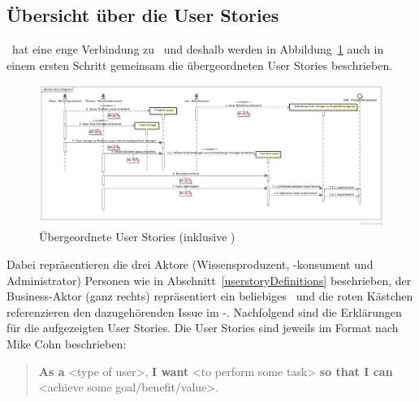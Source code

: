 		
	\begin{landscape}
	\subsection{Übersicht über die User Stories}
	
		\eeppi\ hat eine enge Verbindung zu \cdar\ und deshalb werden in Abbildung~\ref{fig:UserStoryDiagram} auch in einem ersten Schritt gemeinsam die übergeordneten User Stories beschrieben.
	
		\begin{figure}[H]
				\includegraphics[width=0.95\linewidth]{media/diagrams/UserStoryDiagram.png}
				\centering
				\caption{Übergeordnete User Stories (inklusive \cdar)}
				\label{fig:UserStoryDiagram}
		\end{figure}
		
		Dabei repräsentieren die drei Aktore (Wissensproduzent, -konsument und Administrator) Personen wie in Abschnitt~\ref{userstoryDefinitions} beschrieben,
		der Business-Aktor (ganz rechts) repräsentiert ein beliebiges \ppt\ und die roten Kästchen referenzieren den dazugehörenden Issue im \eeppi-\ppt.
		Nachfolgend sind die Erklärungen für die aufgezeigten User Stories.
		Die User Stories sind jeweils im Format nach Mike Cohn\cite{rasmusson_agile_2012} beschrieben:
		\begin{quote}
			\textbf{As a} <type of user>,\newline
			\textbf{I want} <to perform some task>\newline
			\textbf{so that I can} <achieve some goal/benefit/value>.
		\end{quote}
	\end{landscape}
	
		
			
		
			

